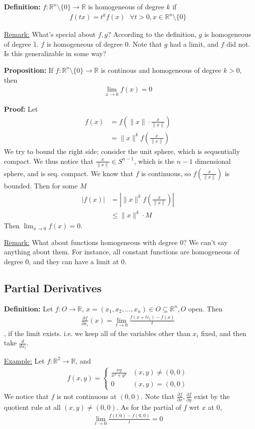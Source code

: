 \documentclass{article}
\newcommand*{\txt}[1]{\text{ #1 }}%
\newcommand*{\fora}{\txt{}\forall}%
\newcommand*{\rr}{\mathbb{R}}%
\begin{document}
\textbf{Definition:} $f:\rr^n\setminus\{0\}\to \rr$ is homogeneous of degree $k$ if \begin{align*}
    f(tx)=t^kf(x)\fora t>0,x\in \rr^n\setminus\{0\}
\end{align*}

\underline{Remark:} What's special about $f,g$? According to the definition, $g$ is homogeneous of degree 1. $f$ is homogeneous of degree 0. Note that $g$ had a limit, and $f$ did not. Is this generalizable in some way?

\textbf{Proposition:} If $f:\rr^n\setminus\{0\}\to \rr$ is continous and homogeneous of degree $k>0$, then \begin{align*}
    \lim_{x\to 0}f(x)=0
\end{align*}

\textbf{Proof:} Let \begin{align*}
    f(x)&=f(\|x\|\cdot \frac{x}{\|x\|})\\
    &=\|x\|^kf(\frac{x}{\|x\|})
\end{align*} We try to bound the right side; consider the unit sphere, which is sequentially compact. We thus notice that $\frac{x}{\|x\|}\in S^{n-1}$, which is the $n-1$ dimensional sphere, and is seq. compact. We know that $f$ is continuous, so $f(\frac{x}{\|x\|})$ is bounded. Then for some $M$ \begin{align*}
    |f(x)|&=|\|x\|^kf(\frac{x}{\|x\|})|\\
    &\leq \|x\|^k\cdot M
\end{align*} Then $\lim_{x\to 0}f(x)=0$.

\underline{Remark:} What about functions homogeneous with degree $0$? We can't say anything about them. For instance, all constant functions are homogeneous of degree 0, and they can have a limit at 0. 

\subsection{Partial Derivatives}
\textbf{Definition:} Let $f:O\to \rr$, $x=(x_1,x_2,...,x_n)\in O\subseteq \rr^n, O$ open. Then \begin{align*}
    \frac{\partial f}{\partial x_i}(x)=\lim_{t\to 0}\frac{f(x+te_i)-f(x)}{t}
\end{align*}, if the limit exists. i.e. we keep all of the variables other than $x_i$ fixed, and then take $\frac{d}{dx_i}$.

\underline{Example:} Let $f:\rr^2\to\rr$, and \begin{align*}
    f(x,y)=\begin{cases}
        \frac{xy}{x^2+y^2} & (x,y)\neq (0,0)\\
        0 & (x,y)=(0,0)
    \end{cases}
\end{align*}
We notice that $f$ is not continuous at $(0,0)$. Note that $\frac{\partial f}{\partial x},\frac{\partial f}{\partial y}$ exist by the quotient rule at all $(x,y)\neq (0,0)$. As for the partial of $f$ wrt $x$ at 0, \begin{align*}
    \lim_{t\to 0}\frac{f(t,0)-f(0,0)}{t}=0
\end{align*}
\end{document}
